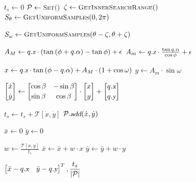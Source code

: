\documentclass[12pt]{article}
\newcommand{\Function}[1]{\ensuremath{{\small \textsc{#1}}}}
\newcommand{\Var}[1]{\ensuremath{{\small{\textsl{#1}}}}}
\begin{document}
\begin{algorithm}[ht]

\caption{$\Function{GetDirection}(q, \beta, \phi, \mathcal{T})$}

\label{algo:2dplanning}

\begin{algorithmic}[1]

\setcounter{ALC@line}{0}

\vspace*{1mm}


\STATE $t_{s} \leftarrow 0$
\STATE $\mathcal{P} \leftarrow \Function{Set()}$
\STATE $\zeta \leftarrow \Function{GetInnerSearchRange}()$
\STATE $S_{\theta} \leftarrow \Function{GetUniformSamples}(0, 2 \pi)$


\STATE $S_{\omega} \leftarrow \Function{GetUniformSamples}(\theta - \zeta, \theta + \zeta)$


\STATE $A_{M} \leftarrow q.\Var{z} \cdot (\tan{(\phi + q.\alpha)} - \tan{\phi}) + \epsilon$
\STATE $A_{m} \leftarrow q.\Var{z} \cdot \frac{\tan{q.\alpha}}{\cos{\phi}} + \epsilon$

\STATE $x \leftarrow q.\Var{z} \cdot \tan{(\phi - q.\alpha)} + A_{M} \cdot (1 + \cos{\omega})$
\STATE $y \leftarrow A_{m} \cdot \sin{\omega}$

\STATE $\begin{bmatrix}
    \dot{x} \\[0.2em]
    \dot{y}
\end{bmatrix} \leftarrow \begin{bmatrix}
    \cos{\beta} & -\sin{\beta} \\[0.2em]
    \sin{\beta} & \cos{\beta}
\end{bmatrix} \cdot \begin{bmatrix}
    x \\[0.2em]
    y
\end{bmatrix} + \begin{bmatrix}
    q.\Var{x} \\[0.2em]
    q.\Var{y}
\end{bmatrix}$

\STATE $t_{s} \leftarrow t_{s} + \mathcal{T}[\dot{x}, \dot{y}]$
\STATE $\mathcal{P}.\Var{add}(\dot{x}, \dot{y})$

\ENDFOR

\ENDFOR

\STATE $\bar{x} \leftarrow 0$
\STATE $\bar{y} \leftarrow 0$


\STATE $w \leftarrow \frac{\mathcal{T}[x, y]}{t_{s}}$
\STATE $\bar{x} \leftarrow \bar{x} + w \cdot x$
\STATE $\bar{y} \leftarrow \bar{y} + w \cdot y$

\ENDFOR

\RETURN $\begin{bmatrix}
    \bar{x} - q.\Var{x} & \bar{y} - q.\Var{y}
\end{bmatrix} ^ T, \mathlarger{\frac{t_s}{|\mathcal{P}|}}$

\end{algorithmic}
\end{algorithm}
\end{document}
